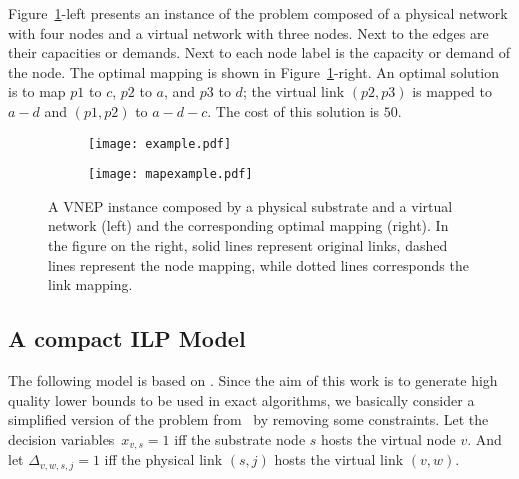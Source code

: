 \documentclass{llncs}
\begin{document}
Figure~\ref{fig:example}-left presents an instance of the problem composed of a physical network with four nodes and a virtual network with three nodes. Next to the edges are their capacities or demands. Next to each node label is the capacity or demand of the node.
The optimal mapping is shown in Figure~\ref{fig:example}-right. 
An optimal solution is to map $p1$ to $c$, $p2$ to $a$, and $p3$ to $d$;
the virtual link $(p2,p3)$ is mapped to $a-d$ and $(p1,p2)$ to $a-d-c$. The cost of this solution is $50$.

\begin{figure}
  \centering
  \begin{subfigure}[b]{0.45\textwidth}
    \centering
    \texttt{[image: example.pdf]}
  \end{subfigure}\quad
  \begin{subfigure}[b]{0.45\textwidth}
    \centering
    \texttt{[image: mapexample.pdf]}
  \end{subfigure}
  \caption{A VNEP instance composed by a physical substrate and a virtual network (left) and the corresponding optimal mapping (right).
In the figure on the right, solid lines represent original links, dashed lines represent the node mapping, while dotted lines corresponds the link mapping.
\label{fig:example}}
\end{figure}






\subsection{A compact ILP Model}
\label{sec:ILPmodel}
The following model is based on \cite{Alkmim2013}. Since the aim of this work is to generate high quality lower bounds to be used in exact algorithms, we basically consider a simplified version of the problem from~\cite{Alkmim2013} by removing some constraints.
Let the decision variables~$x_{v,s} = 1$ iff the substrate node $s$ hosts the virtual node $v$. And let $\Delta_{v,w,s,j} = 1$ iff the physical link $(s,j)$ hosts the virtual link $(v,w)$.
\end{document}
